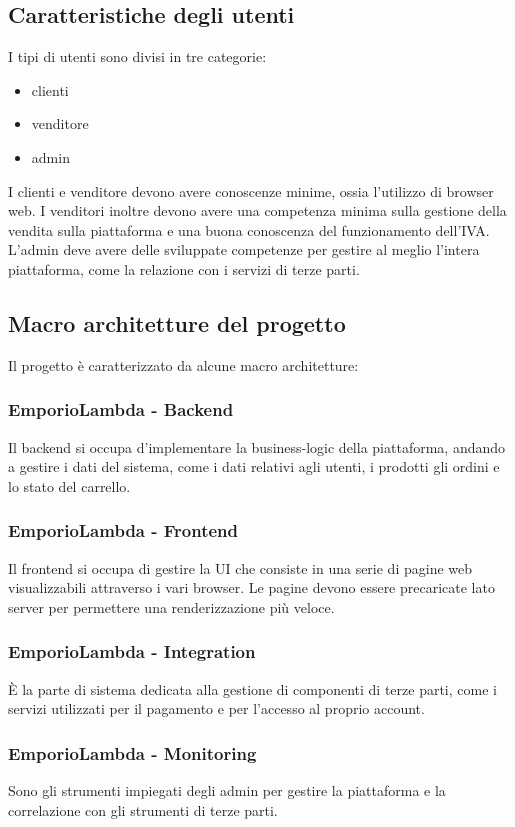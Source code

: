 \subsection{Caratteristiche degli utenti}
I tipi di utenti sono divisi in tre categorie:
\begin{itemize}
    \item clienti
    \item venditore
    \item admin
\end{itemize}
I clienti e venditore devono avere conoscenze minime, ossia l'utilizzo di browser  web. I venditori inoltre devono avere una competenza minima sulla gestione della vendita sulla piattaforma e una buona conoscenza del funzionamento dell'IVA. L'admin deve avere delle sviluppate competenze per gestire al meglio l'intera piattaforma, come la relazione con i servizi di terze parti.
\subsection{Macro architetture del progetto}
Il progetto è caratterizzato da alcune macro architetture:
\subsubsection{EmporioLambda - Backend}
Il backend si occupa d'implementare la business-logic della piattaforma, andando a gestire i dati del sistema, come i dati relativi agli utenti, i prodotti gli ordini e lo stato del carrello. 
\subsubsection{EmporioLambda - Frontend}
Il frontend si occupa di gestire la UI che consiste in una serie di pagine web visualizzabili attraverso i vari browser. Le pagine devono essere precaricate lato server per permettere una renderizzazione più veloce.
\subsubsection{EmporioLambda - Integration}
È la parte di sistema dedicata alla gestione di componenti di terze parti, come i servizi utilizzati per il pagamento e per l'accesso al proprio account.
\subsubsection{EmporioLambda - Monitoring}
Sono gli strumenti impiegati degli admin per gestire la piattaforma e la correlazione con gli strumenti di terze parti.






